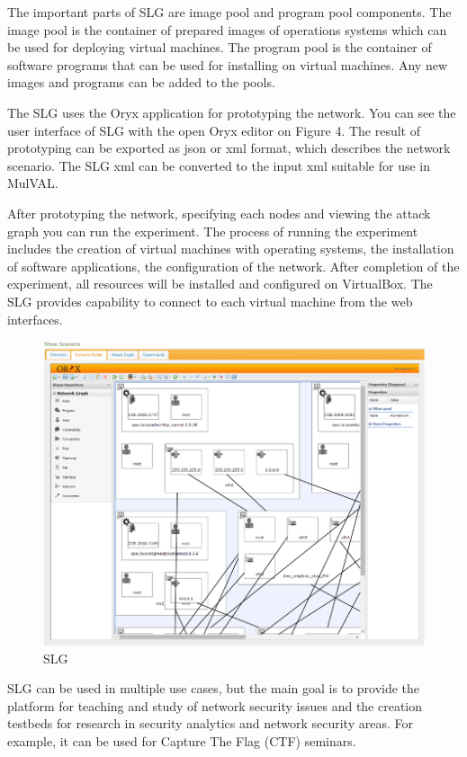 The important parts of SLG are image pool and program pool components. The image pool is the container of prepared images of operations systems which can be used for deploying virtual machines. The program pool is the container of software programs that can be used for installing on virtual machines. Any new images and programs can be added to the pools.

The SLG uses the Oryx application for prototyping the network. You can see the user interface of SLG with the open Oryx editor on Figure 4. The result of prototyping can be exported as json or xml format, which describes the network scenario. The SLG xml can be converted to the input xml suitable for use in MulVAL. 

After prototyping the network, specifying each nodes and viewing the attack graph you can run the experiment. The process of running the experiment includes the creation of virtual machines with operating systems, the installation of software applications, the configuration of the network. After completion of the experiment, all resources will be installed and configured on VirtualBox. The SLG provides capability to connect to each virtual machine from the web interfaces. 

\begin{figure}[ht!]
\centering
\includegraphics[width=\textwidth]{slg.png}
\caption{SLG}
\label{overflow}
\end{figure} 
SLG can be used in multiple use cases, but the main goal is to provide the platform for teaching and study of network security issues and the creation testbeds for research in security analytics and network security areas. For example, it can be used for Capture The Flag (CTF) seminars.


